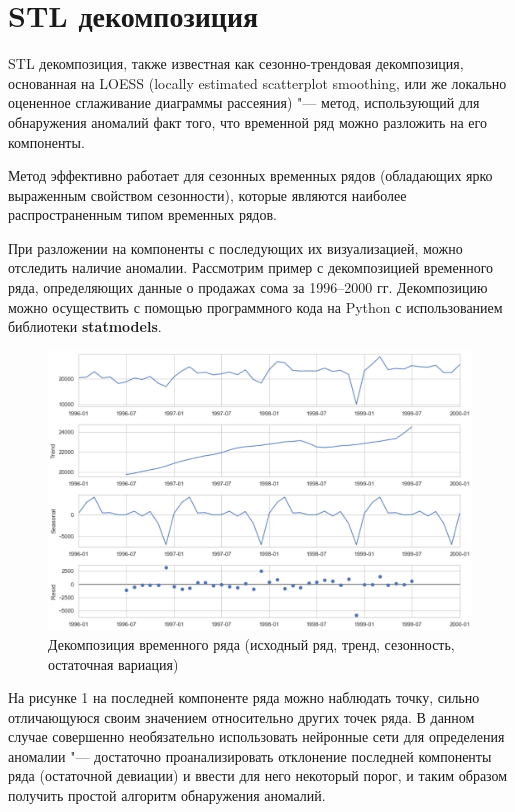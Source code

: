 \documentclass[bachelor, och, referat]{../shiza}
\begin{document}
\section{STL декомпозиция}

        STL декомпозиция, также известная как сезонно-трендовая декомпозиция,
        основанная на LOESS (locally estimated scatterplot smoothing, или же
        локально оцененное сглаживание диаграммы рассеяния) "--- метод,
        использующий для обнаружения аномалий факт того, что временной ряд можно
        разложить на его компоненты.

        Метод эффективно работает для сезонных временных рядов (обладающих ярко
        выраженным свойством сезонности), которые являются наиболее
        распространенным типом временных рядов.

        При разложении на компоненты с последующих их визуализацией, можно
        отследить наличие аномалии. Рассмотрим пример с декомпозицией временного
        ряда, определяющих данные о продажах сома за 1996–2000 гг. Декомпозицию
        можно осуществить с помощью программного кода на Python с использованием
        библиотеки \textbf{statmodels}.

        \begin{figure}[H]
            \centering
            \includegraphics[width=1\textwidth]{pic/stl.png}
            \caption{Декомпозиция временного ряда (исходный ряд, тренд, сезонность, остаточная вариация)}
        \end{figure}

        На рисунке 1 на последней компоненте ряда можно наблюдать точку, сильно
        отличающуюся своим значением относительно других точек ряда. В данном
        случае совершенно необязательно использовать нейронные сети для
        определения аномалии "--- достаточно проанализировать отклонение
        последней компоненты ряда (остаточной девиации) и ввести для него
        некоторый порог, и таким образом получить простой алгоритм обнаружения
        аномалий.
\end{document}
